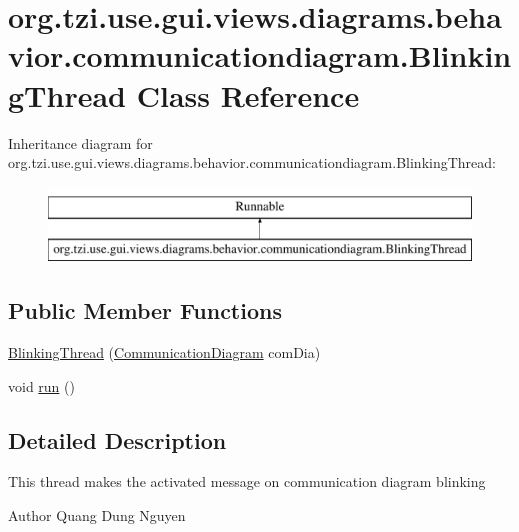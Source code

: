 \hypertarget{classorg_1_1tzi_1_1use_1_1gui_1_1views_1_1diagrams_1_1behavior_1_1communicationdiagram_1_1_blinking_thread}{\section{org.\-tzi.\-use.\-gui.\-views.\-diagrams.\-behavior.\-communicationdiagram.\-Blinking\-Thread Class Reference}
\label{classorg_1_1tzi_1_1use_1_1gui_1_1views_1_1diagrams_1_1behavior_1_1communicationdiagram_1_1_blinking_thread}
}
Inheritance diagram for org.\-tzi.\-use.\-gui.\-views.\-diagrams.\-behavior.\-communicationdiagram.\-Blinking\-Thread\-:\begin{figure}[H]
\begin{center}
\leavevmode
\includegraphics[height=2.000000cm]{classorg_1_1tzi_1_1use_1_1gui_1_1views_1_1diagrams_1_1behavior_1_1communicationdiagram_1_1_blinking_thread}
\end{center}
\end{figure}
\subsection*{Public Member Functions}
\begin{DoxyCompactItemize}
\item 
\hyperlink{classorg_1_1tzi_1_1use_1_1gui_1_1views_1_1diagrams_1_1behavior_1_1communicationdiagram_1_1_blinking_thread_a2cc9b718fdd91b0e4b8c5579141921e9}{Blinking\-Thread} (\hyperlink{classorg_1_1tzi_1_1use_1_1gui_1_1views_1_1diagrams_1_1behavior_1_1communicationdiagram_1_1_communication_diagram}{Communication\-Diagram} com\-Dia)
\item 
void \hyperlink{classorg_1_1tzi_1_1use_1_1gui_1_1views_1_1diagrams_1_1behavior_1_1communicationdiagram_1_1_blinking_thread_a9748385e73b3ccda86e159f0284df8f1}{run} ()
\end{DoxyCompactItemize}


\subsection{Detailed Description}
This thread makes the activated message on communication diagram blinking \begin{DoxyAuthor}{Author}
Quang Dung Nguyen 
\end{DoxyAuthor}


